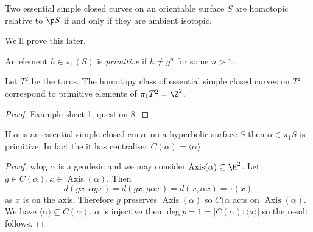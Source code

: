 \documentclass[a4paper]{article}
\renewcommand{\b}{\p}
\DeclareMathOperator{\Axis}{Axis}
\begin{document}
\begin{lemma}
  Two essential simple closed curves on an orientable surface \(S\) are homotopic relative to \(\b S\) if and only if they are ambient isotopic.
\end{lemma}

We'll prove this later.

\begin{definition}
  An element \(h \in \pi_1(S)\) is \emph{primitive} if \(h \neq g^n\) for some \(n > 1\).
\end{definition}

\begin{lemma}
  Let \(T^2\) be the torus. The homotopy class of essential simple closed curves on \(T^2\) correspond to primitive elements of \(\pi_1 T^2 = \Z^2\).
\end{lemma}

\begin{proof}
  Example sheet 1, question 8.
\end{proof}

\begin{lemma}
  If \(\alpha\) is an essential simple closed curve on a hyperbolic surface \(S\) then \(\alpha \in \pi_1S\) is primitive. In fact the it has centraliser \(C(\alpha) = \langle \alpha\rangle\).
\end{lemma}

\begin{proof}
  wlog \(\alpha\) is a geodesic and we may consider \(\Axis(\alpha) \subseteq \H^2\). Let \(g \in C(\alpha), x \in \Axis(\alpha)\). Then
  \[
    d(gx, \alpha gx) = d(gx, g\alpha x) = d(x, \alpha x) = \tau(x)
  \]
  as \(x\) is on the axis. Therefore \(g\) preserves \(\Axis(\alpha)\) so \(C(\alpha\) acts on \(\Axis(\alpha)\). We have \(\langle \alpha \rangle \subseteq C(\alpha)\). \(\alpha\) is injective then \(\deg p = 1 = |C(\alpha): \langle a \rangle|\) so the result follows.
\end{proof}

















\printindex
\end{document}
